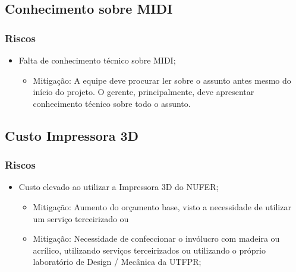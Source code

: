 \documentclass[hyperref={pdfpagelabels=false}]{beamer}
\begin{document}
        \subsection{Conhecimento sobre MIDI}

           \begin{frame}\frametitle{Riscos}

        	   \begin{itemize}
        	       \item Falta de conhecimento técnico sobre MIDI;
        	           \begin{itemize}
           	     	        \item Mitigação: A equipe deve procurar ler sobre o assunto antes mesmo do início do projeto. O gerente, principalmente, deve apresentar conhecimento técnico sobre todo o assunto.
        	           \end{itemize}
                \end{itemize}

           \end{frame}

        \subsection{Custo Impressora 3D}

           \begin{frame}\frametitle{Riscos}

        	   \begin{itemize}
        	       \item Custo elevado ao utilizar a Impressora 3D do NUFER;
        	           \begin{itemize}
           	     	        \item Mitigação: Aumento do orçamento base, visto a necessidade de utilizar um serviço terceirizado ou
            	         	\item Mitigação: Necessidade de confeccionar o invólucro com madeira ou acrílico, utilizando serviços terceirizados ou utilizando o próprio laboratório de Design / Mecânica da UTFPR;
        	           \end{itemize}
               \end{itemize}

            \end{frame}
\end{document}

